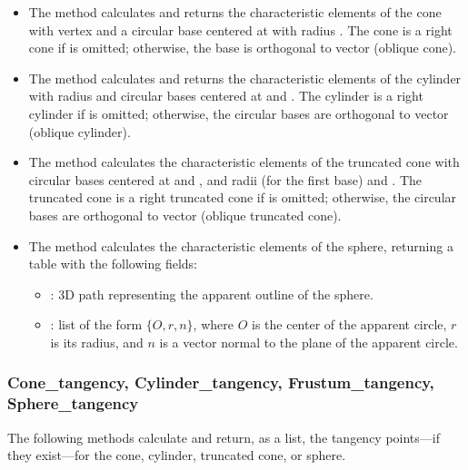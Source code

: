 \begin{itemize}
    \item The method  calculates and returns the characteristic elements of the cone with vertex  and a circular base centered at  with radius . The cone is a right cone if  is omitted; otherwise, the base is orthogonal to vector  (oblique cone). 

    \item The method  calculates and returns the characteristic elements of the cylinder with radius  and circular bases centered at  and . The cylinder is a right cylinder if  is omitted; otherwise, the circular bases are orthogonal to vector  (oblique cylinder). 

    \item The method  calculates the characteristic elements of the truncated cone with circular bases centered at  and , and radii  (for the first base) and . The truncated cone is a right truncated cone if  is omitted; otherwise, the circular bases are orthogonal to vector  (oblique truncated cone). 

    \item The method  calculates the characteristic elements of the sphere, returning a table with the following fields:
    \begin{itemize}
        \item {}: 3D path representing the apparent outline of the sphere. 
        \item {}: list of the form $\{O,r,n\}$, where $O$ is the center of the apparent circle, $r$ is its radius, and $n$ is a vector normal to the plane of the apparent circle. 
    \end{itemize}
\end{itemize}


\subsubsection{Cone\_tangency, Cylinder\_tangency, Frustum\_tangency, Sphere\_tangency}

The following methods calculate and return, as a list, the tangency points—if they exist—for the cone, cylinder, truncated cone, or sphere.

